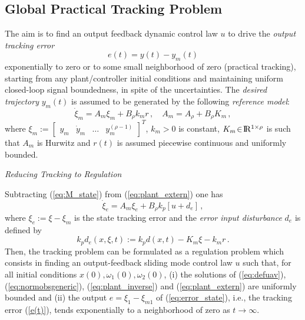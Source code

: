 \documentclass{rncauth}
\def\re{{\rm I}\! {\rm R}}
\begin{document}
\subsection{Global Practical Tracking Problem}


The aim is to find an output feedback dynamic control law $u$
to drive the {\em output tracking error}
%
\begin{equation}
e(t) = y(t) - y_m(t)\label{e(t)}
\end{equation}
%
exponentially to zero or to some small neighborhood of zero
(practical tracking), starting from any plant/controller initial
conditions and maintaining uniform closed-loop signal boundedness,
in spite of the uncertainties.
%
The {\em desired trajectory} $y_m(t)$ is assumed to be generated
by the following {\em reference model}:
%
\begin{equation}
\label{eq:M_state} \dot{\xi}_m  =  A_m \xi_m + B_\rho k_m r\,,
\quad A_m=A_\rho+B_\rho K_m\,,
\end{equation}
%
where $\xi_m\!:=\![\begin{array}{cccc}y_m & \dot{y}_m & \ldots &
y_m^{(\rho-1)}\end{array}]^T$, $k_m\!>\!0$ is constant,
$K_m\!\in\!\re^{1 \times \rho}$ is  such that $A_m$ is
Hurwitz and $r(t)$ is assumed piecewise continuous and uniformly bounded.




\smallskip
{\em Reducing Tracking to Regulation}
\smallskip

Subtracting (\ref{eq:M_state}) from (\ref{eq:plant_extern}) one
has
%
\begin{equation}
\dot{\xi}_e=A_m \xi_e + B_\rho k_p[u + d_e]\,, %
\label{eq:error_state}
\end{equation}
%
where $\xi_e\!:=\!\xi\!-\!\xi_m$ is the state tracking error and
the {\em error input disturbance} $d_e$ is defined by
%
\begin{equation}
\label{eq:defd} k_p d_e(x,\xi,t):=k_p d(x,t) - K_{m} \xi - k_m
r\,.
\end{equation}
%
Then, the tracking problem can be formulated as a regulation
problem which consists in finding an output-feedback sliding mode
control law $u$ such that, for all initial conditions
$x(0),\omega_1(0),\omega_2(0)$, (i) the solutions of
(\ref{eq:defuav}), (\ref{eq:normobsgeneric}),
(\ref{eq:plant_inverse}) and (\ref{eq:plant_extern}) are uniformly
bounded and (ii) the output $e=\xi_1-\xi_{m1}$ of
(\ref{eq:error_state}), i.e., the tracking error (\ref{e(t)}),
tends exponentially to a neighborhood of zero as $t \to \infty$.
\end{document}
